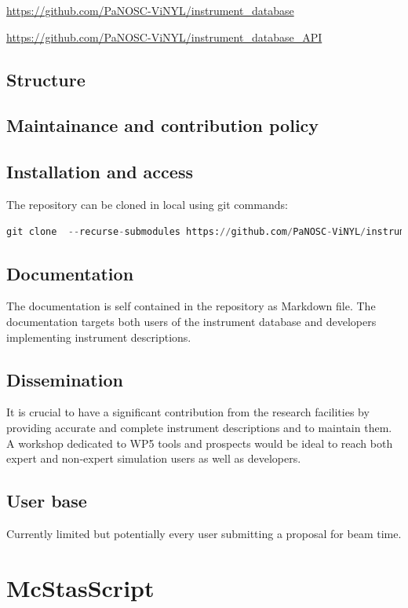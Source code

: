 \documentclass[11pt, a4paper]{article}
\begin{document}
\href{https://github.com/PaNOSC-ViNYL/instrument_database}{https://github.com/PaNOSC-ViNYL/instrument\_database}


\href{https://github.com/PaNOSC-ViNYL/instrument_database_API}{https://github.com/PaNOSC-ViNYL/instrument\_database\_API}

\subsection{Structure}
\subsection{Maintainance and contribution policy}

\subsection{Installation and access}
The repository can be cloned in local using git commands:
\begin{lstlisting}[language=Python]
git clone  --recurse-submodules https://github.com/PaNOSC-ViNYL/instrument_database.git
\end{lstlisting}


\subsection{Documentation}
The documentation is self contained in the repository as Markdown file. 
The documentation targets both users of the instrument database and developers implementing instrument descriptions.

\subsection{Dissemination}
It is crucial to have a significant contribution from the research facilities by providing accurate and complete instrument descriptions and to maintain them.
A workshop dedicated to WP5 tools and prospects would be ideal to reach both expert and non-expert simulation users as well as developers.

\subsection{User base}
Currently limited but potentially every user submitting a proposal for beam time.



\section{McStasScript\label{sec:mcstasscript}}
\end{document}
